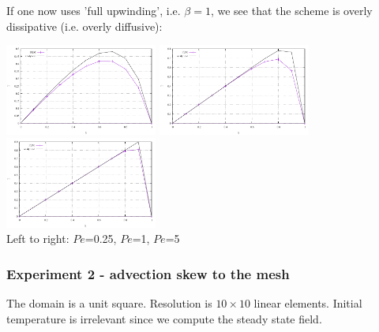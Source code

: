 If one now uses 'full upwinding', i.e. $\beta=1$, we see that the scheme is 
overly dissipative (i.e. overly diffusive):

\begin{center}
\includegraphics[width=5cm]{python_codes/fieldstone_65/results/artdiff1/T1.pdf}
\includegraphics[width=5cm]{python_codes/fieldstone_65/results/artdiff1/T2.pdf}
\includegraphics[width=5cm]{python_codes/fieldstone_65/results/artdiff1/T3.pdf}\\
{\captionfont Left to right: $Pe$=0.25, $Pe$=1, $Pe$=5}
\end{center}

\newpage
\subsubsection*{Experiment 2 - advection skew to the mesh}

The domain is a unit square. Resolution is $10\times10$ linear elements. Initial temperature is 
irrelevant since we compute the steady state field. 

